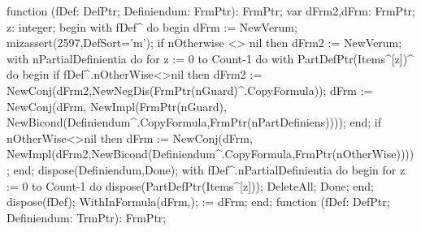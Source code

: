 \nwenddocs{}\endmoddef\nwstartdeflinemarkup{}\nwenddeflinemarkup
function (fDef: DefPtr;
                 Definiendum: FrmPtr): FrmPtr;
var
   dFrm2,dFrm: FrmPtr;
   z: integer;
begin
   with fDef^ do
   begin
      dFrm := NewVerum;
      mizassert(2597,DefSort='m');
      if nOtherwise <> nil then dFrm2 := NewVerum;
      with nPartialDefinientia do
         for z := 0 to Count-1 do
            with PartDefPtr(Items^[z])^ do
         begin
            if fDef^.nOtherWise<>nil then
               dFrm2 := NewConj(dFrm2,NewNegDis(FrmPtr(nGuard)^.CopyFormula));
            dFrm := NewConj(dFrm,
                            NewImpl(FrmPtr(nGuard),
                                    NewBicond(Definiendum^.CopyFormula,FrmPtr(nPartDefiniens))));
         end;
      if nOtherWise<>nil then
         dFrm := NewConj(dFrm,
                         NewImpl(dFrm2,NewBicond(Definiendum^.CopyFormula,FrmPtr(nOtherWise))));
   end;
   dispose(Definiendum,Done);
   with fDef^.nPartialDefinientia do
   begin
      for z := 0 to Count-1 do dispose(PartDefPtr(Items^[z]));
      DeleteAll; Done;
   end;
   dispose(fDef);
   WithInFormula(dFrm,);
    := dFrm;
end;
\eatline
{}\nwendcode{}\nwdocspar
\nwenddocs{}\endmoddef\nwstartdeflinemarkup{}\nwenddeflinemarkup
function (fDef: DefPtr;
                   Definiendum: TrmPtr): FrmPtr;
